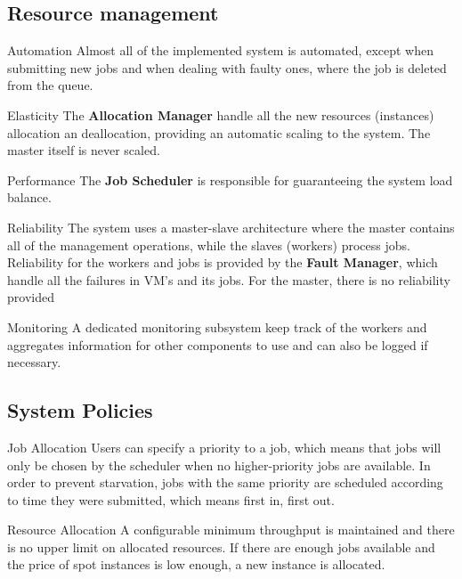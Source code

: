 \documentclass[a4paper]{IEEEtran}
\begin{document}
\subsection*{Resource management}

\begin{LaTeXdescription}
\item[Automation]
Almost all of the implemented system is automated, except when submitting new jobs and when dealing with faulty ones, where the job is deleted from the queue.

\item[Elasticity]
The \textbf{Allocation Manager} handle all the new resources (instances) allocation an deallocation, providing an automatic scaling to the system. The master itself is never scaled.

\item[Performance]
The \textbf{Job Scheduler} is responsible for guaranteeing the system load balance.

\item[Reliability]
The system uses a master-slave architecture where the master contains all of the management operations, while the slaves (workers) process jobs. Reliability for the workers and jobs is provided by the \textbf{Fault Manager}, which handle all the failures in VM's and its jobs. For the master, there is no reliability provided

\item[Monitoring]
A dedicated monitoring subsystem keep track of the workers and aggregates information for other components to use and can also be logged if necessary.

\end{LaTeXdescription}

\subsection*{System Policies}

\begin{LaTeXdescription}

\item[Job Allocation]
Users can specify a priority to a job, which means that jobs will only be chosen by the scheduler when no higher-priority jobs are available. In order to prevent starvation, jobs with the same priority are scheduled according to time they were submitted, which means first in, first out.

\item[Resource Allocation]
A configurable minimum throughput is maintained and there is no upper limit on allocated resources. If there are enough jobs available and the price of spot instances is low enough, a new instance is allocated.

\end{LaTeXdescription}
\end{document}
